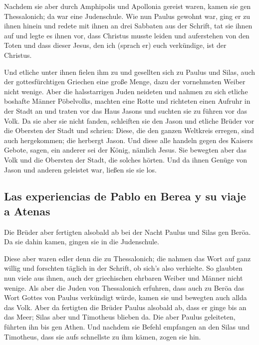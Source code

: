  Nachdem sie aber durch Amphipolis und Apollonia gereist
waren, kamen sie gen Thessalonich; da war eine Judenschule.
 Wie nun Paulus gewohnt war, ging er zu ihnen hinein und
redete mit ihnen an drei Sabbaten aus der Schrift,  tat
sie ihnen auf und legte es ihnen vor, dass Christus musste leiden und
auferstehen von den Toten und dass dieser Jesus, den ich (sprach er)
euch verkündige, ist der Christus.

 Und etliche unter ihnen fielen ihm zu und gesellten sich
zu Paulus und Silas, auch der gottesfürchtigen Griechen eine große
Menge, dazu der vornehmsten Weiber nicht wenige.  Aber die
halsstarrigen Juden neideten und nahmen zu sich etliche boshafte Männer
Pöbelvolks, machten eine Rotte und richteten einen Aufruhr in der Stadt
an und traten vor das Haus Jasons und suchten sie zu führen vor das
Volk.  Da sie aber sie nicht fanden, schleiften sie den
Jason und etliche Brüder vor die Obersten der Stadt und schrien: Diese,
die den ganzen Weltkreis erregen, sind auch hergekommen; 
die herbergt Jason. Und diese alle handeln gegen des Kaisers Gebote,
sagen, ein anderer sei der König, nämlich Jesus.  Sie
bewegten aber das Volk und die Obersten der Stadt, die solches hörten.
 Und da ihnen Genüge von Jason und anderen geleistet war,
ließen sie sie los.

\hypertarget{las-experiencias-de-pablo-en-berea-y-su-viaje-a-atenas}{%
\subsection{Las experiencias de Pablo en Berea y su viaje a
Atenas}\label{las-experiencias-de-pablo-en-berea-y-su-viaje-a-atenas}}

 Die Brüder aber fertigten alsobald ab bei der Nacht
Paulus und Silas gen Beröa. Da sie dahin kamen, gingen sie in die
Judenschule.

 Diese aber waren edler denn die zu Thessalonich; die
nahmen das Wort auf ganz willig und forschten täglich in der Schrift, ob
sich's also verhielte.  So glaubten nun viele aus ihnen,
auch der griechischen ehrbaren Weiber und Männer nicht wenige.
 Als aber die Juden von Thessalonich erfuhren, dass auch
zu Beröa das Wort Gottes von Paulus verkündigt würde, kamen sie und
bewegten auch allda das Volk.  Aber da fertigten die
Brüder Paulus alsobald ab, dass er ginge bis an das Meer; Silas aber und
Timotheus blieben da.  Die aber Paulus geleiteten,
führten ihn bis gen Athen. Und nachdem sie Befehl empfangen an den Silas
und Timotheus, dass sie aufs schnellste zu ihm kämen, zogen sie hin.

